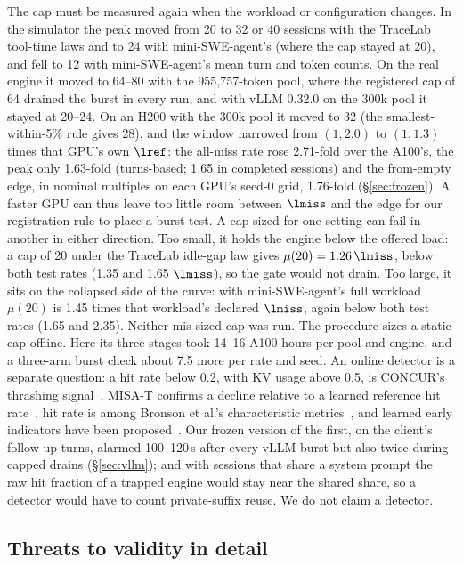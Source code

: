The cap must be measured again when the workload or configuration changes. In the simulator the peak moved from 20 to 32 or 40 sessions with the TraceLab tool-time laws and to 24 with mini-SWE-agent's (where the cap stayed at 20), and fell to 12 with mini-SWE-agent's mean turn and token counts. On the real engine it moved to 64--80 with the 955,757-token pool, where the registered cap of 64 drained the burst in every run, and with vLLM 0.32.0 on the 300k pool it stayed at 20--24. On an H200 with the 300k pool it moved to 32 (the smallest-within-5\% rule gives 28), and the window narrowed from $(1,2.0)$ to $(1,1.3)$ times that GPU's own $\lref$: the all-miss rate rose 2.71-fold over the A100's, the peak only 1.63-fold (turns-based; 1.65 in completed sessions) and the from-empty edge, in nominal multiples on each GPU's seed-0 grid, 1.76-fold (\S\ref{sec:frozen}). A faster GPU can thus leave too little room between $\lmiss$ and the edge for our registration rule to place a burst test. A cap sized for one setting can fail in another in either direction. Too small, it holds the engine below the offered load: a cap of 20 under the TraceLab idle-gap law gives $\mu(20)=1.26\,\lmiss$, below both test rates (1.35 and 1.65 $\lmiss$), so the gate would not drain. Too large, it sits on the collapsed side of the curve: with mini-SWE-agent's full workload $\mu(20)$ is 1.45 times that workload's declared $\lmiss$, again below both test rates (1.65 and 2.35). Neither mis-sized cap was run. The procedure sizes a static cap offline. Here its three stages took 14--16 A100-hours per pool and engine, and a three-arm burst check about 7.5 more per rate and seed. An online detector is a separate question: a hit rate below 0.2, with KV usage above 0.5, is CONCUR's thrashing signal~\citep{chen2026concur}, MISA-T confirms a decline relative to a learned reference hit rate~\citep{hong2026misat}, hit rate is among Bronson et al.'s characteristic metrics~\citep{bronson2021metastable}, and learned early indicators have been proposed~\citep{majumdar2026learning}. Our frozen version of the first, on the client's follow-up turns, alarmed 100--120\,s after every vLLM burst but also twice during capped drains (\S\ref{sec:vllm}); and with sessions that share a system prompt the raw hit fraction of a trapped engine would stay near the shared share, so a detector would have to count private-suffix reuse. We do not claim a detector.

\subsection{Threats to validity in detail}
